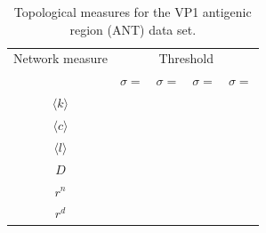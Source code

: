 \documentclass[12pt]{article}
\begin{document}
\begin{table}[]
 \begin{center}
 \caption{\footnotesize Topological measures for the VP1 antigenic region (ANT) data set.}
  \begin{tabular}{ccccc}
\toprule
  Network measure & \multicolumn{4}{c}{Threshold}\\
 & $\sigma=$& $\sigma=$& $\sigma=$&$\sigma=$\\
 \midrule
$\langle k \rangle$ &     &          &          & \\
$\langle c \rangle$ &     &          &          & \\
$\langle l \rangle$ &     &          &          & \\ %
  $D$ &     &          &          & \\ %
$r^{n}$ &   &          &          & \\ %
$r^{d}$ &   &          &          & \\ %
\bottomrule
  \end{tabular}
 \end{center}
 \label{tab:indANT}
\end{table}
\end{document}
